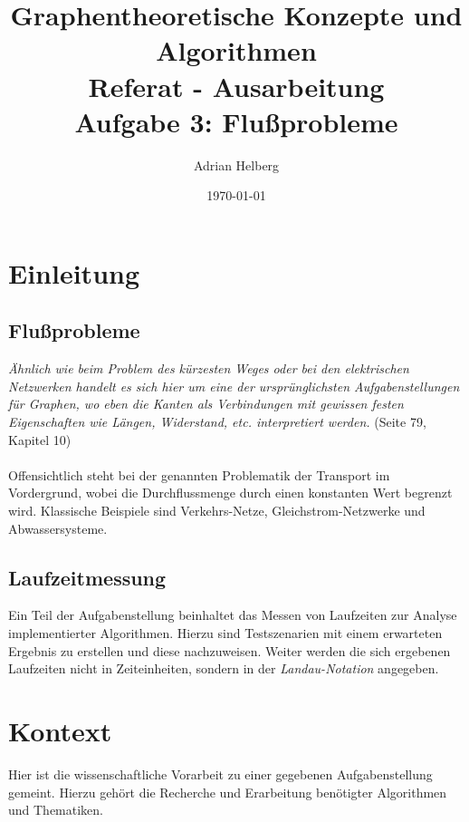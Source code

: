 \documentclass[11pt]{article}
\title{
\Large Graphentheoretische Konzepte und Algorithmen\\
\huge Referat - Ausarbeitung\\
\Large Aufgabe 3: Flu\ss{}probleme\\[0.3in]
}
\author{Adrian Helberg\\}
\date{\today}
\begin{document}
    \maketitle
    \newpage
    \tableofcontents

    \newpage

    \section{Einleitung}

    \subsection{Flu\ss{}probleme}
    \textit{\"Ahnlich wie beim Problem des k\"urzesten Weges oder bei den elektrischen Netzwerken handelt es sich hier um eine der urspr\"unglichsten Aufgabenstellungen f\"ur Graphen, wo eben die Kanten als Verbindungen mit gewissen festen Eigenschaften wie L\"angen, Widerstand, etc. interpretiert werden.} \cite{alggra} (Seite 79, Kapitel 10)\\~\\
    Offensichtlich steht bei der genannten Problematik der Transport im Vordergrund, wobei die Durchflussmenge durch einen konstanten Wert begrenzt wird. Klassische Beispiele sind Verkehrs-Netze, Gleichstrom-Netzwerke und Abwassersysteme.

    \subsection{Laufzeitmessung}
    Ein Teil der Aufgabenstellung beinhaltet das Messen von Laufzeiten zur Analyse implementierter Algorithmen. Hierzu sind Testszenarien mit einem erwarteten Ergebnis zu erstellen und diese nachzuweisen. Weiter werden die sich ergebenen Laufzeiten nicht in Zeiteinheiten, sondern in der \textit{Landau-Notation} angegeben.

    \section{Kontext}
    Hier ist die wissenschaftliche Vorarbeit zu einer gegebenen Aufgabenstellung gemeint. Hierzu geh\"ort die Recherche und Erarbeitung ben\"otigter Algorithmen und Thematiken.
\end{document}
